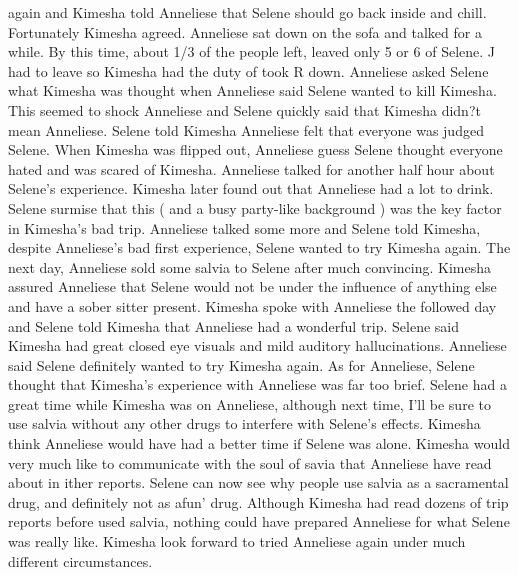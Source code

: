 \documentclass[12pt]{book}
\begin{document}
again and Kimesha told Anneliese that Selene should go back inside and chill. Fortunately Kimesha agreed. Anneliese sat down on the sofa and talked for a while. By this time, about 1/3 of the people left, leaved only 5 or 6 of Selene. J had to leave so Kimesha had the duty of took R down. Anneliese asked Selene what Kimesha was thought when Anneliese said Selene wanted to kill Kimesha. This seemed to shock Anneliese and Selene quickly said that Kimesha didn?t mean Anneliese. Selene told Kimesha Anneliese felt that everyone was judged Selene. When Kimesha was flipped out, Anneliese guess Selene thought everyone hated and was scared of Kimesha. Anneliese talked for another half hour about Selene's experience. Kimesha later found out that Anneliese had a lot to drink. Selene surmise that this ( and a busy party-like background ) was the key factor in Kimesha's bad trip. Anneliese talked some more and Selene told Kimesha, despite Anneliese's bad first experience, Selene wanted to try Kimesha again. The next day, Anneliese sold some salvia to Selene after much convincing. Kimesha assured Anneliese that Selene would not be under the influence of anything else and have a sober sitter present. Kimesha spoke with Anneliese the followed day and Selene told Kimesha that Anneliese had a wonderful trip. Selene said Kimesha had great closed eye visuals and mild auditory hallucinations. Anneliese said Selene definitely wanted to try Kimesha again. As for Anneliese, Selene thought that Kimesha's experience with Anneliese was far too brief. Selene had a great time while Kimesha was on Anneliese, although next time, I'll be sure to use salvia without any other drugs to interfere with Selene's effects. Kimesha think Anneliese would have had a better time if Selene was alone. Kimesha would very much like to communicate with the soul of savia that Anneliese have read about in ither reports. Selene can now see why people use salvia as a sacramental drug, and definitely not as afun' drug. Although Kimesha had read dozens of trip reports before used salvia, nothing could have prepared Anneliese for what Selene was really like. Kimesha look forward to tried Anneliese again under much different circumstances.
\end{document}
